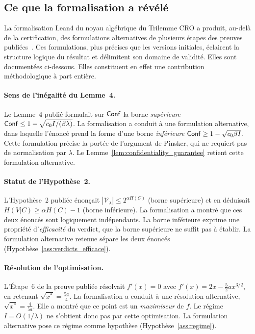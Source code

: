 \subsection{Ce que la formalisation a r\'ev\'el\'e}
\label{subsec:lean4_formulations}
\begin{sloppypar}
La formalisation Lean4 du noyau alg\'ebrique du Trilemme CRO a produit,
au-del\`a de la certification, des formulations alternatives de plusieurs
\'etapes des preuves publi\'ees~\cite{MINKA2026CRO,MINKA2026PQCRO}. Ces
formulations, plus pr\'ecises que les versions initiales, \'eclairent la
structure logique du r\'esultat et d\'elimitent son domaine de validit\'e.
Elles sont document\'ees ci-dessous. Elles constituent en effet une contribution
m\'ethodologique \`a part enti\`ere.

\paragraph{Sens de l'in\'egalit\'e du Lemme~4.}
Le Lemme~4 publi\'e formulait sur $\mathsf{Conf}$ la borne \emph{sup\'erieure}
$\mathsf{Conf} \leq 1 - \sqrt{c_0 I / (\beta\lambda)}$. La formalisation a conduit
\`a une formulation alternative, dans laquelle l'\'enonc\'e prend la forme
d'une borne \emph{inf\'erieure} $\mathsf{Conf} \geq 1 - \sqrt{c_0 \beta I}$. Cette
formulation pr\'ecise la port\'ee de l'argument de Pinsker, qui ne requiert
pas de normalisation par $\lambda$. Le
Lemme~\ref{lem:confidentiality_guarantee} retient cette formulation
alternative.

\paragraph{Statut de l'Hypoth\`ese~2.}
L'Hypoth\`ese~2 publi\'ee \'enon\c{c}ait $|\mathcal{V}_\lambda| \leq
2^{\alpha H(C)}$ (borne sup\'erieure) et en d\'eduisait
$H(V|C) \geq \alpha H(C) - 1$ (borne inf\'erieure). La formalisation a
montr\'e que ces deux \'enonc\'es sont logiquement ind\'ependants. La borne
inf\'erieure exprime une propri\'et\'e d'\emph{efficacit\'e} du verdict, que
la borne sup\'erieure ne suffit pas \`a \'etablir. La formulation alternative
retenue s\'epare les deux \'enonc\'es
(Hypoth\`ese~\ref{ass:verdicts_efficace}).

\paragraph{R\'esolution de l'optimisation.}
L'\'Etape~6 de la preuve publi\'ee r\'esolvait $f'(x) = 0$ avec
$f'(x) = 2x - \frac{5}{2}ax^{3/2}$, en retenant $\sqrt{x^*} =
\frac{5a}{4}$. La formalisation a conduit \`a une r\'esolution
alternative, $\sqrt{x^*} = \frac{4}{5a}$. Elle a montr\'e que ce point
est un \emph{maximiseur} de $f$. Le r\'egime $I = O(1/\lambda)$ ne
s'obtient donc pas par cette optimisation. La formulation alternative
pose ce r\'egime comme hypoth\`ese (Hypoth\`ese~\ref{ass:regime}).


\end{sloppypar}
